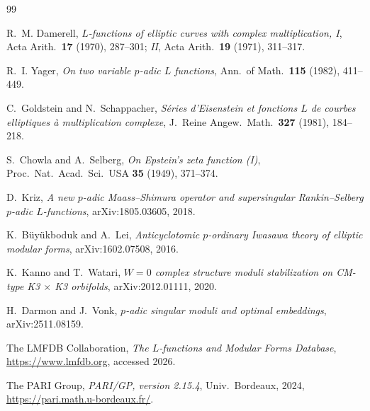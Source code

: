 \documentclass[12pt]{amsart}
\theoremstyle{definition}
\begin{document}
\begin{thebibliography}{99}

  R.~M. Damerell,
  \textit{$L$-functions of elliptic curves with complex multiplication, I},
  Acta Arith.\ \textbf{17} (1970), 287--301;
  \textit{II}, Acta Arith.\ \textbf{19} (1971), 311--317.

  R.~I. Yager,
  \textit{On two variable $p$-adic $L$ functions},
  Ann.\ of Math.\ \textbf{115} (1982), 411--449.

  C.~Goldstein and N.~Schappacher,
  \textit{Séries d'Eisenstein et fonctions $L$ de courbes elliptiques à
  multiplication complexe},
  J.\ Reine Angew.\ Math.\ \textbf{327} (1981), 184--218.

  S.~Chowla and A.~Selberg,
  \textit{On Epstein's zeta function (I)},
  Proc.\ Nat.\ Acad.\ Sci.\ USA \textbf{35} (1949), 371--374.

  D.~Kriz,
  \textit{A new $p$-adic Maass--Shimura operator and supersingular
  Rankin--Selberg $p$-adic $L$-functions},
  arXiv:1805.03605, 2018.

  K.~Büyükboduk and A.~Lei,
  \textit{Anticyclotomic $p$-ordinary Iwasawa theory of elliptic modular forms},
  arXiv:1602.07508, 2016.

  K.~Kanno and T.~Watari,
  \textit{$W=0$ complex structure moduli stabilization on CM-type
  K3 $\times$ K3 orbifolds},
  arXiv:2012.01111, 2020.

  H.~Darmon and J.~Vonk,
  \textit{$p$-adic singular moduli and optimal embeddings},
  arXiv:2511.08159.

  The LMFDB Collaboration,
  \textit{The $L$-functions and Modular Forms Database},
  \url{https://www.lmfdb.org}, accessed 2026.

  The PARI Group,
  \textit{PARI/GP, version 2.15.4},
  Univ.\ Bordeaux, 2024,
  \url{https://pari.math.u-bordeaux.fr/}.


\end{thebibliography}
\end{document}
